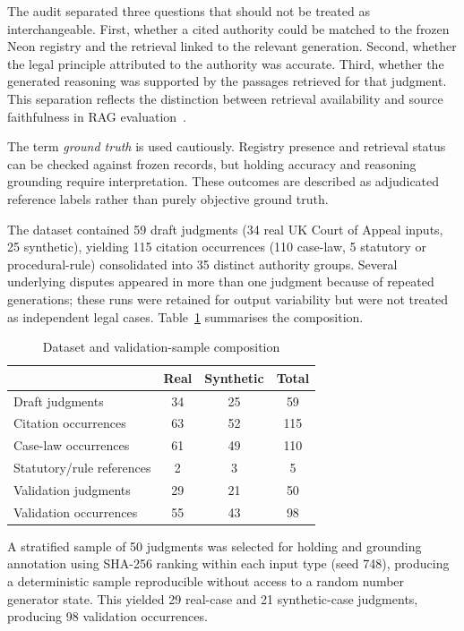 \documentclass[conference]{IEEEtran}
\begin{document}
The audit separated three questions that should not be treated as interchangeable. First, whether a cited authority could be matched to the frozen Neon registry and the retrieval linked to the relevant generation. Second, whether the legal principle attributed to the authority was accurate. Third, whether the generated reasoning was supported by the passages retrieved for that judgment. This separation reflects the distinction between retrieval availability and source faithfulness in RAG evaluation~\cite{ragas2024}.

The term \textit{ground truth} is used cautiously. Registry presence and retrieval status can be checked against frozen records, but holding accuracy and reasoning grounding require interpretation. These outcomes are described as adjudicated reference labels rather than purely objective ground truth.

The dataset contained 59 draft judgments (34 real UK Court of Appeal inputs, 25 synthetic), yielding 115 citation occurrences (110 case-law, 5 statutory or procedural-rule) consolidated into 35 distinct authority groups. Several underlying disputes appeared in more than one judgment because of repeated generations; these runs were retained for output variability but were not treated as independent legal cases. Table~\ref{tab:dataset} summarises the composition.

\begin{table}[t]
\centering
\caption{Dataset and validation-sample composition}
\label{tab:dataset}
\begin{tabular}{lccc}
\toprule
& \textbf{Real} & \textbf{Synthetic} & \textbf{Total} \\
\midrule
Draft judgments & 34 & 25 & 59 \\
Citation occurrences & 63 & 52 & 115 \\
Case-law occurrences & 61 & 49 & 110 \\
Statutory/rule references & 2 & 3 & 5 \\
\midrule
Validation judgments & 29 & 21 & 50 \\
Validation occurrences & 55 & 43 & 98 \\
\bottomrule
\end{tabular}
\end{table}

A stratified sample of 50 judgments was selected for holding and grounding annotation using SHA-256 ranking within each input type (seed 748), producing a deterministic sample reproducible without access to a random number generator state. This yielded 29 real-case and 21 synthetic-case judgments, producing 98 validation occurrences.
\end{document}

